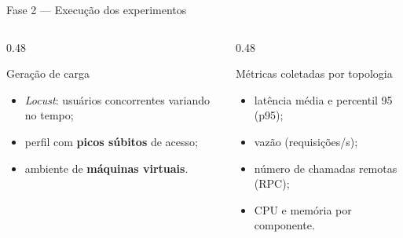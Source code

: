 \begin{frame}{Fase 2 --- Execução dos experimentos}
    \begin{columns}[T]
        \begin{column}{0.48\textwidth}
            \begin{block}{Geração de carga}
                \small
                \begin{itemize}
                    \item \textit{Locust}: usuários concorrentes variando no tempo;
                    \item perfil com \textbf{picos súbitos} de acesso;
                    \item ambiente de \textbf{máquinas virtuais}.
                \end{itemize}
            \end{block}
        \end{column}
        \begin{column}{0.48\textwidth}
            \begin{block}{Métricas coletadas por topologia}
                \small
                \begin{itemize}
                    \item latência média e percentil 95 (p95);
                    \item vazão (requisições/s);
                    \item número de chamadas remotas (RPC);
                    \item CPU e memória por componente.
                \end{itemize}
            \end{block}
        \end{column}
    \end{columns}
    \vfill
    \begin{center}
    \end{center}
\end{frame}

